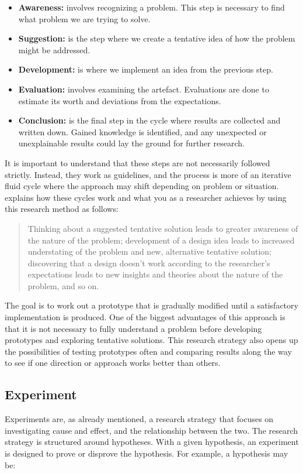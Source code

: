 \begin{itemize}
    \item\textbf{Awareness:} involves recognizing a problem. This step is necessary to find what problem we are trying to solve.
    \item\textbf{Suggestion:} is the step where we create a tentative idea of how the problem might be addressed.
    \item\textbf{Development:} is where we implement an idea from the previous step.
    \item\textbf{Evaluation:} involves examining the artefact. Evaluations are done to estimate its worth and deviations from the expectations.
    \item\textbf{Conclusion:} is the final step in the cycle where results are collected and written down. Gained knowledge is identified, and any unexpected or unexplainable results could lay the ground for further research.
\end{itemize}

It is important to understand that these steps are not necessarily followed strictly. Instead, they work as guidelines, and the process is more of an iterative fluid cycle where the approach may shift depending on problem or situation. \citet[pp.~112]{oates2005researching} explains how these cycles work and what you as a researcher achieves by using this research method as follows:

\begin{quote}
    Thinking about a suggested tentative solution leads to greater awareness of the nature of the problem; development of a design idea leads to increased understating of the problem and new, alternative tentative solution; discovering that a design doesn't work according to the researcher's expectations leads to new insights and theories about the nature of the problem, and so on. 
\end{quote}

The goal is to work out a prototype that is gradually modified until a satisfactory implementation is produced. One of the biggest advantages of this approach is that it is not necessary to fully understand a problem before developing prototypes and exploring tentative solutions. This research strategy also opens up the possibilities of testing prototypes often and comparing results along the way to see if one direction or approach works better than others. 

\subsection{Experiment}
\label{sec:experiment}
Experiments are, as already mentioned, a research strategy that focuses on investigating cause and effect, and the relationship between the two. The research strategy is structured around hypotheses. With a given hypothesis, an experiment is designed to prove or disprove the hypothesis. For example, a hypothesis may be:

